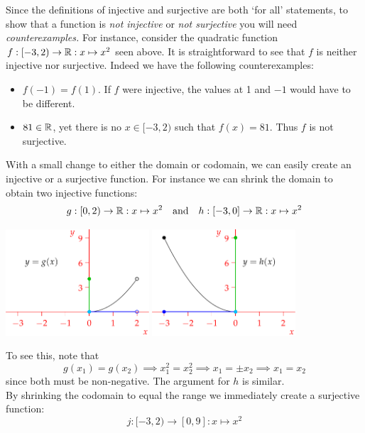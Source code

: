  Since the definitions of injective and surjective are both `for all' statements, to show that a function is \emph{not injective} or \emph{not surjective} you will need \emph{counterexamples.} For instance, consider the quadratic function $f:[-3,2)\to\mathbb{R}:x\mapsto x^2$ seen above. It is straightforward to see that $f$ is neither injective nor surjective. Indeed we have the following counterexamples:
		\begin{itemize}%
  	  \item $f(-1)=f(1)$. If $f$ were injective, the values at 1 and $-1$ would have to be different.
  	  \item $81\in\mathbb{R}$, yet there is no $x\in[-3,2)$ such that $f(x)=81$. Thus $f$ is not surjective.
		\end{itemize}
With a small change to either the domain or codomain, we can easily create an injective or a surjective function. For instance we can shrink the domain to obtain two injective functions:
\[g:[0,2)\to\mathbb{R}:x\mapsto x^2\quad\text{and}\quad h:[-3,0]\to\mathbb{R}:x\mapsto x^2\]
\begin{center}
\includegraphics[width=0.4\textwidth]{sets-18-rangedom2}
\qquad\qquad\qquad
\includegraphics[width=0.4\textwidth]{sets-19-rangedom3}
\end{center}
To see this, note that
\[g(x_1)=g(x_2)\implies x_1^2=x_2^2\implies x_1=\pm x_2\implies x_1=x_2\]
since both must be non-negative. The argument for $h$ is similar.\\
By shrinking the codomain to equal the range we immediately create a surjective function:
\[j:[-3,2)\to [0,9]:x\mapsto x^2\]


